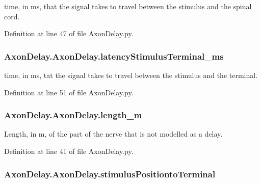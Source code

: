 time, in ms, that the signal takes to travel between the stimulus and the spinal cord. 



Definition at line 47 of file Axon\-Delay.\-py.

\hypertarget{class_axon_delay_1_1_axon_delay_a88845b9926b97db88174ce088d5af5e0}{
\subsubsection[{latency\-Stimulus\-Terminal\-\_\-ms}]{\setlength{\rightskip}{0pt plus 5cm}Axon\-Delay.\-Axon\-Delay.\-latency\-Stimulus\-Terminal\-\_\-ms}}\label{class_axon_delay_1_1_axon_delay_a88845b9926b97db88174ce088d5af5e0}


time, in ms, tat the signal takes to travel between the stimulus and the terminal. 



Definition at line 51 of file Axon\-Delay.\-py.

\hypertarget{class_axon_delay_1_1_axon_delay_a08ab7285929002db2108179ea9f5d5dd}{
\subsubsection[{length\-\_\-m}]{\setlength{\rightskip}{0pt plus 5cm}Axon\-Delay.\-Axon\-Delay.\-length\-\_\-m}}\label{class_axon_delay_1_1_axon_delay_a08ab7285929002db2108179ea9f5d5dd}


Length, in m, of the part of the nerve that is not modelled as a delay. 



Definition at line 41 of file Axon\-Delay.\-py.

\hypertarget{class_axon_delay_1_1_axon_delay_a3f6bb8f38c4474806544d01fbe9c0361}{
\subsubsection[{stimulus\-Positionto\-Terminal}]{\setlength{\rightskip}{0pt plus 5cm}Axon\-Delay.\-Axon\-Delay.\-stimulus\-Positionto\-Terminal}}\label{class_axon_delay_1_1_axon_delay_a3f6bb8f38c4474806544d01fbe9c0361}


